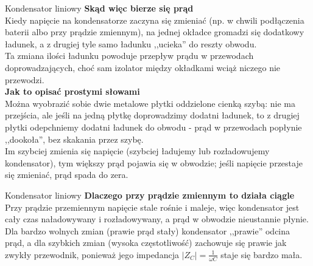 \begin{frame}{Kondensator liniowy}
	\textbf{Skąd więc bierze się prąd}\\
	Kiedy napięcie na kondensatorze zaczyna się zmieniać (np. w chwili podłączenia baterii albo przy prądzie zmiennym), na jednej okładce gromadzi się dodatkowy ładunek, a z drugiej tyle samo ładunku ,,ucieka'' do reszty obwodu.\\
	Ta zmiana ilości ładunku powoduje przepływ prądu w przewodach doprowadzających, choć sam izolator między okładkami wciąż niczego nie przewodzi.\\
	\textbf{Jak to opisać prostymi słowami}\\
	Można wyobrazić sobie dwie metalowe płytki oddzielone cienką szybą: nie ma przejścia, ale jeśli na jedną płytkę doprowadzimy dodatni ładunek, to z drugiej płytki odepchniemy dodatni ładunek do obwodu - prąd w przewodach popłynie ,,dookoła'', bez skakania przez szybę.\\
	Im szybciej zmienia się napięcie (szybciej ładujemy lub rozładowujemy kondensator), tym większy prąd pojawia się w obwodzie; jeśli napięcie przestaje się zmieniać, prąd spada do zera.\\
\end{frame}

\begin{frame}{Kondensator liniowy}
	\textbf{Dlaczego przy prądzie zmiennym to działa ciągle}\\
	Przy prądzie przemiennym napięcie stale rośnie i maleje, więc kondensator jest cały czas naładowywany i rozładowywany, a prąd w obwodzie nieustannie płynie.\\
	Dla bardzo wolnych zmian (prawie prąd stały) kondensator ,,prawie'' odcina prąd, a dla szybkich zmian (wysoka częstotliwość) zachowuje się prawie jak zwykły przewodnik, ponieważ jego impedancja $|Z_C| = \frac{1}{\omega C}$ staje się bardzo mała.
\end{frame}

